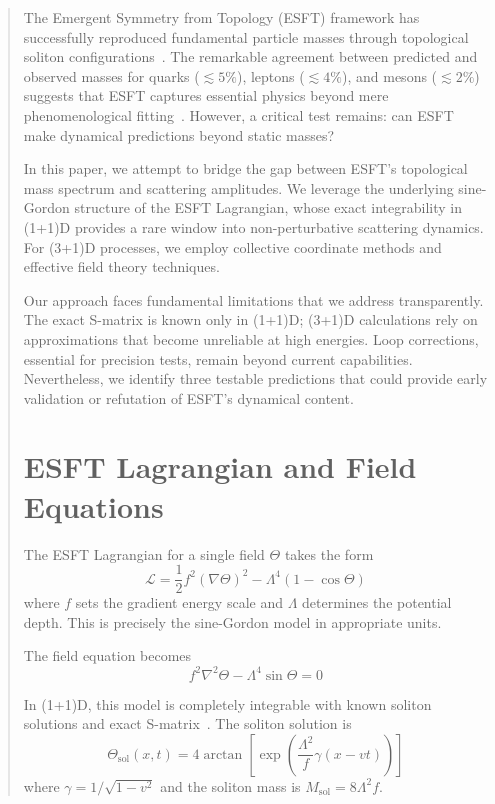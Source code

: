 ﻿\documentclass[twocolumn,prd,amsmath,amssymb,aps]{revtex4-2}
\begin{document}
\begin{abstract}
The Emergent Symmetry from Topology (ESFT) framework has successfully reproduced fundamental particle masses through topological soliton configurations~\cite{ESFT1,ESFT2,ESFT3}. The remarkable agreement between predicted and observed masses for quarks ($\lesssim 5\%$), leptons ($\lesssim 4\%$), and mesons ($\lesssim 2\%$) suggests that ESFT captures essential physics beyond mere phenomenological fitting~\cite{ESFT4,ESFT5,ESFT6}. However, a critical test remains: can ESFT make dynamical predictions beyond static masses?

In this paper, we attempt to bridge the gap between ESFT's topological mass spectrum and scattering amplitudes. We leverage the underlying sine-Gordon structure of the ESFT Lagrangian, whose exact integrability in (1+1)D provides a rare window into non-perturbative scattering dynamics. For (3+1)D processes, we employ collective coordinate methods and effective field theory techniques.

Our approach faces fundamental limitations that we address transparently. The exact S-matrix is known only in (1+1)D; (3+1)D calculations rely on approximations that become unreliable at high energies. Loop corrections, essential for precision tests, remain beyond current capabilities. Nevertheless, we identify three testable predictions that could provide early validation or refutation of ESFT's dynamical content.

\section{ESFT Lagrangian and Field Equations}

The ESFT Lagrangian for a single field $\Theta$ takes the form
\begin{equation}
\mathcal{L} = \frac{1}{2}f^2(\nabla\Theta)^2 - \Lambda^4(1-\cos\Theta)
\label{eq:esft_lagrangian}
\end{equation}
where $f$ sets the gradient energy scale and $\Lambda$ determines the potential depth. This is precisely the sine-Gordon model in appropriate units.

The field equation becomes
\begin{equation}
f^2\nabla^2\Theta - \Lambda^4\sin\Theta = 0
\label{eq:field_equation}
\end{equation}

In (1+1)D, this model is completely integrable with known soliton solutions and exact S-matrix~\cite{Zamolodchikov1979}. The soliton solution is
\begin{equation}
\Theta_{\text{sol}}(x,t) = 4\arctan\left[\exp\left(\frac{\Lambda^2}{f}\gamma(x-vt)\right)\right]
\end{equation}
where $\gamma = 1/\sqrt{1-v^2}$ and the soliton mass is $M_{\text{sol}} = 8\Lambda^2 f$.


\end{abstract}
\end{document}
